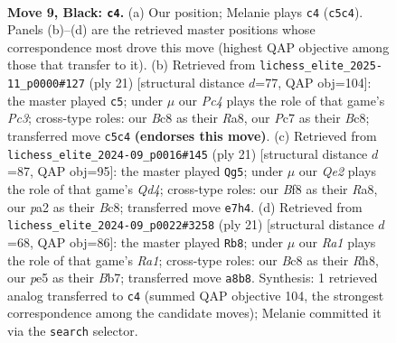\documentclass[11pt]{article}
\begin{document}
\clearpage

\begin{figure}[p]\centering
\begin{subfigure}{0.46\textwidth}\centering
\resizebox{\linewidth}{!}{%
\newchessgame
\chessboard[
  setfen={r1b1kbnr/p1ppqppp/8/2p1P3/6PP/8/PPP1QP2/RNB1KB1R b KQkq - 0 9},
  showmover=false,
  pgfstyle=straightmove, color=movearrow, markmove={c5-c4}
]}
\caption{}
\end{subfigure}\hfill
\begin{subfigure}{0.46\textwidth}\centering
\resizebox{\linewidth}{!}{%
\newchessgame
\chessboard[
  setfen={r1b1kb1r/2ppqppp/2p5/4P3/pnP4P/5N2/PP2QPP1/R1B1KB1R b KQkq - 2 11},
  showmover=false,
  pgfstyle=straightmove, color=movearrow, markmove={c6-c5}
]}
\caption{}
\end{subfigure}
\\[4pt]
\begin{subfigure}{0.46\textwidth}\centering
\resizebox{\linewidth}{!}{%
\newchessgame
\chessboard[
  setfen={r1b1k2r/pppp1ppp/2n5/3q4/1b2p3/4P3/PP1PBPPP/R1BQK2R b KQkq - 2 11},
  showmover=false,
  pgfstyle=straightmove, color=movearrow, markmove={d5-g5}
]}
\caption{}
\end{subfigure}\hfill
\begin{subfigure}{0.46\textwidth}\centering
\resizebox{\linewidth}{!}{%
\newchessgame
\chessboard[
  setfen={r3kb1r/pb1pqppp/2n5/2ppP3/8/2P2N2/P1P1QPPP/1RB1KB1R b Kkq - 2 11},
  showmover=false,
  pgfstyle=straightmove, color=movearrow, markmove={a8-b8}
]}
\caption{}
\end{subfigure}
\caption{\textbf{Move 9, Black: \texttt{c4}.} (a) Our position; Melanie plays \texttt{c4} (\texttt{c5c4}). Panels (b)--(d) are the retrieved master positions whose correspondence most drove this move (highest QAP objective among those that transfer to it). (b) Retrieved from \texttt{lichess\_elite\_2025-11\_p0000\#127} (ply 21) [structural distance $d$=77, QAP obj=104]: the master played \texttt{c5}; under $\mu$ our \emph{Pc4} plays the role of that game's \emph{Pc3}; cross-type roles: our \emph{B}c8 as their \emph{R}a8, our \emph{P}c7 as their \emph{B}c8; transferred move \texttt{c5c4} \textbf{(endorses this move)}. (c) Retrieved from \texttt{lichess\_elite\_2024-09\_p0016\#145} (ply 21) [structural distance $d$=87, QAP obj=95]: the master played \texttt{Qg5}; under $\mu$ our \emph{Qe2} plays the role of that game's \emph{Qd4}; cross-type roles: our \emph{B}f8 as their \emph{R}a8, our \emph{p}a2 as their \emph{B}c8; transferred move \texttt{e7h4}. (d) Retrieved from \texttt{lichess\_elite\_2024-09\_p0022\#3258} (ply 21) [structural distance $d$=68, QAP obj=86]: the master played \texttt{Rb8}; under $\mu$ our \emph{Ra1} plays the role of that game's \emph{Ra1}; cross-type roles: our \emph{B}c8 as their \emph{R}h8, our \emph{p}e5 as their \emph{B}b7; transferred move \texttt{a8b8}. Synthesis: 1 retrieved analog transferred to \texttt{c4} (summed QAP objective 104, the strongest correspondence among the candidate moves); Melanie committed it via the \texttt{search} selector.}
\label{fig:thought-m17}
\end{figure}
\end{document}
